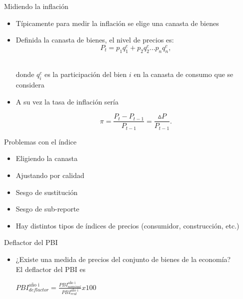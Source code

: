 \documentclass{beamer}
\begin{document}
\begin{frame}{Midiendo la inflación}
\begin{itemize}    
    \item Típicamente para medir la inflación se elige una canasta de bienes \vspace{1mm}
    \item Definida la canasta de bienes, el nivel de precios es: 
        \begin{equation}
            P_t = p_1 q_1^c+ p_2 q_2^c...p_n q_n^c,
        \end{equation}

    \\ donde $q_i^c$ es la participación del bien $i$ en la canasta de consumo que se considera

    \item A su vez la tasa de inflación sería 

    \begin{equation}
        \pi =\frac{P_t - P_{t-1}}{P_{t-1}}= \frac{\vartriangle P}{P_{t-1}}.
    \end{equation}
\end{itemize}
\end{frame}

\begin{frame}{Problemas con el índice}
    \begin{itemize}
        \item Eligiendo la canasta \vspace{1mm}
        \item Ajustando por calidad \vspace{1mm}
        \item Sesgo de sustitución \vspace{1mm}
        \item Sesgo de sub-reporte \vspace{1mm}
        \item Hay distintos tipos de índices de precios (consumidor, construcción, etc.)
    \end{itemize}
\end{frame}

\begin{frame}{Deflactor del PBI }
\begin{itemize}
\item ¿Existe una medida de precios del conjunto de bienes de la economía? \\ \vspace{2mm}
El deflactor del PBI es
        \begin{center}                              $PBI_{deflactor}^{\text{año i}}=\frac{PBI_{nominal}^{\text{año i}}}{PBI_{real}^{\text{año i}}} x 100$
        \end{center}
\end{itemize}
\end{frame}
\end{document}
